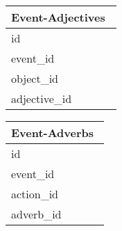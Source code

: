 \documentclass[10pt]{article}
\begin{document}
\begin{multicols}{2}
\begin{tabular}{|p{0.95\linewidth}|} 
\hline                   
\textbf{Event-Adjectives}
\\
\hline
id\\
\hline
event\_id\\
\hline
object\_id\\
\hline
adjective\_id\\
\hline
\end{tabular}



\begin{tabular}{|p{0.95\linewidth}|} 
\hline                   
\textbf{Event-Adverbs}
\\
\hline
id\\
\hline
event\_id\\
\hline
action\_id\\
\hline
adverb\_id\\
\hline
\end{tabular}

\end{multicols}

 
\end{document}
